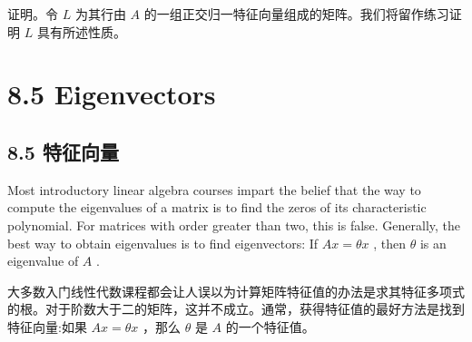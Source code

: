 \documentclass[10pt]{article}
\begin{document}
\begin{tcolorbox}\relax
证明。令 \(L\) 为其行由 \(A\) 的一组正交归一特征向量组成的矩阵。我们将留作练习证明 \(L\) 具有所述性质。
\end{tcolorbox}

\section*{8.5 Eigenvectors}

\begin{tcolorbox}\relax
\section*{8.5 特征向量}
\end{tcolorbox}

Most introductory linear algebra courses impart the belief that the way to compute the eigenvalues of a matrix is to find the zeros of its characteristic polynomial. For matrices with order greater than two, this is false. Generally, the best way to obtain eigenvalues is to find eigenvectors: If \({Ax} = {\theta x}\) , then \(\theta\) is an eigenvalue of \(A\) .

\begin{tcolorbox}\relax
大多数入门线性代数课程都会让人误以为计算矩阵特征值的办法是求其特征多项式的根。对于阶数大于二的矩阵，这并不成立。通常，获得特征值的最好方法是找到特征向量:如果 \({Ax} = {\theta x}\) ，那么 \(\theta\) 是 \(A\) 的一个特征值。
\end{tcolorbox}
\end{document}
